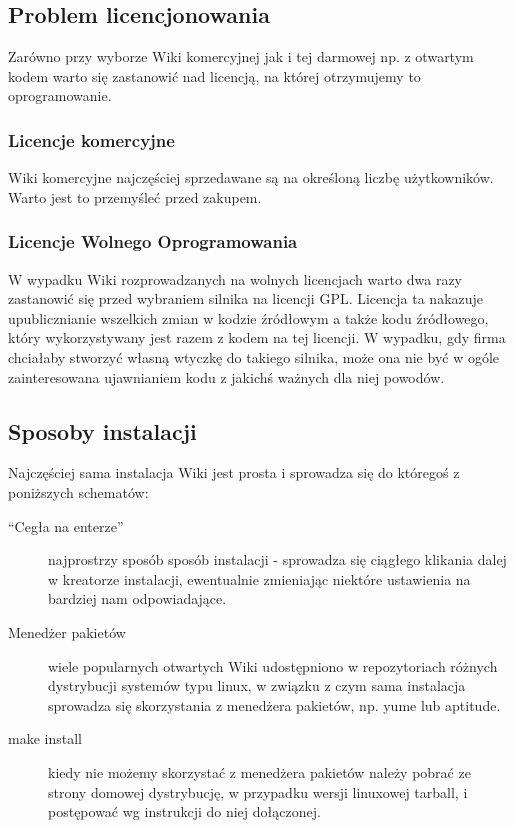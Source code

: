 \documentclass{article}
\begin{document}
	\subsection{Problem licencjonowania}
	Zarówno przy wyborze Wiki komercyjnej jak i tej darmowej np. z otwartym kodem warto się zastanowić nad licencją, na której otrzymujemy to oprogramowanie.
	\subsubsection{Licencje komercyjne}
		Wiki komercyjne najczęściej sprzedawane są na określoną liczbę użytkowników. Warto jest to przemyśleć przed zakupem.  
	\subsubsection{Licencje Wolnego Oprogramowania}
		W wypadku Wiki rozprowadzanych na wolnych licencjach warto dwa razy zastanowić się przed wybraniem silnika na licencji GPL. Licencja ta nakazuje upublicznianie wszelkich zmian w kodzie źródłowym a także kodu źródłowego, który wykorzystywany jest razem z kodem na tej licencji. W wypadku, gdy firma chciałaby stworzyć własną wtyczkę do takiego silnika, może ona nie być w ogóle zainteresowana ujawnianiem kodu z jakichś ważnych dla niej powodów. 
	\subsection{Sposoby instalacji}
		Najczęściej sama instalacja Wiki jest prosta i sprowadza się do któregoś z poniższych schematów:		
		\begin{description}
		    \item[``Cegła na enterze''] najprostrzy sposób sposób instalacji - sprowadza się ciągłego klikania dalej w kreatorze instalacji, ewentualnie zmieniając niektóre ustawienia na bardziej nam odpowiadające.
			\item[Menedżer pakietów] wiele popularnych otwartych Wiki udostępniono w repozytoriach różnych dystrybucji systemów typu linux, w związku z czym sama instalacja sprowadza się skorzystania z menedżera pakietów, np. yume lub aptitude.
			\item[make install] kiedy nie możemy skorzystać z menedżera pakietów należy pobrać ze strony domowej dystrybucję, w przypadku wersji linuxowej tarball, i postępować wg instrukcji do niej dołączonej. 
 		\end{description}
\end{document}
